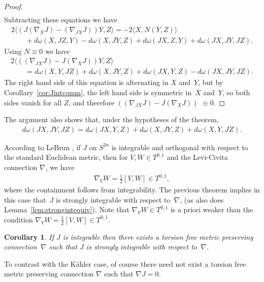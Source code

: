 \documentclass[10pt,a4paper]{amsart}
\newtheorem{cor}[thm]{Corollary}
\numberwithin{equation}{section}
\begin{document}
\begin{proof}
\begin{gather*}
\end{gather*}
Subtracting these equations we have
\begin{gather*}
2\langle ( J ( \nabla_X J ) -( \nabla_{JX} J ) ) Y , Z \rangle= -2 \langle X, N(Y,Z) \rangle\\
\qquad{} + d \omega (X,JZ,Y) - d \omega (X,JY,Z) + d \omega (JX,Z,Y) + d \omega (JX,JY,JZ).
\end{gather*}
Using $N \equiv 0$ we have
\begin{gather*}
2\langle ( ( \nabla_{JX} J ) - J ( \nabla_X J ) ) Y , Z \rangle\\
\qquad{} = d \omega (X,Y, JZ) + d \omega (X,JY,Z) + d \omega (JX,Y,Z) - d \omega (JX,JY,JZ).
\end{gather*}
The right hand side of this equation is alternating in $X$ and~$Y$, but by Corollary~\ref{cor:Jintcomm}, the left hand side is symmetric in~$X$ and~$Y$, so both sides vanish for all $Z$, and therefore $ ( ( \nabla_{JX} J ) - J ( \nabla_X J ) )$ $\equiv 0$.
\end{proof}

The argument also shows that, under the hypotheses of the theorem,
\begin{gather*}
d \omega (JX,JY,JZ) = d \omega (JX,Y,Z) + d \omega (X,JY,Z) + d \omega (X,Y, JZ).
\end{gather*}

\begin{rmk} \label{rmk;orthversusstrong}
According to LeBrun \cite{L}, if $J$ on $S^{2n}$ is integrable and orthogonal with respect to the standard Euclidean metric, then for $V,W \in T^{0,1}$ and the Levi-Civita connection $\nabla$, we have
\begin{gather*}
\nabla_V W = \frac 1 2 [V,W] \in T^{0,1},
\end{gather*}
where the containment follows from integrability. The previous theorem implies in this case that~$J$ is strongly integrable with respect to~$\nabla$, (as also does Lemma~\ref{lem:strongintequiv}). Note that $\nabla_V W \in T^{0,1}$ is a priori weaker than the condition $\nabla_V W = \frac 1 2 [V,W] \in T^{0,1}$.
 \end{rmk}

\begin{cor}If $J$ is integrable then there exists a torsion free metric preserving connection~$\nabla$ such that $J$ is strongly integrable with respect to~$\nabla$.
\end{cor}

To contrast with the K\"ahler case, of course there need not exist a torsion free metric preserving connection $\nabla$ such that $\nabla J = 0$.
\end{document}
